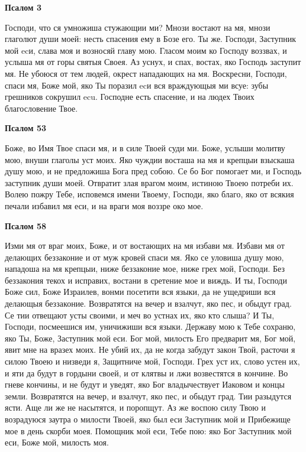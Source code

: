 

\label{_content_pravilo-svyatogo-amvrosiya}

 

 


\medskip\bfseries Псалом 3\normalfont{}\nopagebreak


Господи, что ся умножиша стужающии ми? Мнози востают на мя, мнози глаголют души моей: несть спасения ему в Бозе его. Ты же. Господи, Заступник мой ecи, слава моя и возносяй главу мою. Гласом моим ко Господу воззвах, и услыша мя от горы святыя Своея. Аз уснух, и спах, востах, яко Господь заступит мя. Не убоюся от тем людей, окрест нападающих на мя. Воскресни, Господи, спаси мя, Боже мой, яко Ты поразил ecи вся враждующыя ми всуе: зубы грешников сокрушил ecu. Господне есть спасение, и на людех Твоих благословение Твое.


\medskip\bfseries Псалом 53\normalfont{}\nopagebreak


Боже, во Имя Твое спаси мя, и в силе Твоей суди ми. Боже, услыши молитву мою, внуши глаголы уст моих. Яко чуждии восташа на мя и крепцыи взыскаша душу мою, и не предложиша Бога пред собою. Се бо Бог помогает ми, и Господь заступник души моей. Отвратит злая врагом моим, истиною Твоею потреби их. Волею пожру Тебе, исповемся имени Твоему, Господи, яко благо, яко от всякия печали избавил мя еси, и на враги моя воззре око мое.


\medskip\bfseries Псалом 58\normalfont{}\nopagebreak


Изми мя от враг моих, Боже, и от востающих на мя избави мя. Избави мя от делающих беззаконие и от муж кровей спаси мя. Яко се уловиша душу мою, нападоша на мя крепцыи, ниже беззаконие мое, ниже грех мой, Господи. Без беззакония текох и исправих, востани в сретение мое и виждь. И ты, Господи Боже сил, Боже Израилев, вонми посетити вся языки, да не ущедриши вся делающыя беззаконие. Возвратятся на вечер и взалчут, яко пес, и обыдут град. Се тии отвещают усты своими, и меч во устнах их, яко кто слыша? И Ты, Господи, посмеешися им, уничижиши вся языки. Державу мою к Тебе сохраню, яко Ты, Боже, Заступник мой еси. Бог мой, милость Его предварит мя, Бог мой, явит мне на вразех моих. Не убий их, да не когда забудут закон Твой, расточи я силою Твоею и низведи я, Защитниче мой, Господи. Грех уст их, слово устен их, и яти да будут в гордыни своей, и от клятвы и лжи возвестятся в кончине. Во гневе кончины, и не будут и уведят, яко Бог владычествует Иаковом и концы земли. Возвратятся на вечер, и взалчут, яко пес, и обыдут град. Тии разыдутся ясти. Аще ли же не насытятся, и поропщут. Аз же воспою силу Твою и возрадуюся заутра о милости Твоей, яко был еси Заступник мой и Прибежище мое в день скорби моея. Помощник мой еси, Тебе пою: яко Бог Заступник мой еси, Боже мой, милость моя.


